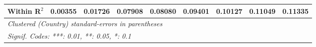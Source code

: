 \begin{table}[htbp]
\begin{tabular}{lcccccccc}
      Within R$^2$                                                     & 0.00355  & 0.01726  & 0.07908        & 0.08080        & 0.09401        & 0.10127        & 0.11049        & 0.11335\\  
      \midrule \midrule
      \multicolumn{9}{l}{\emph{Clustered (Country) standard-errors in parentheses}}\\
      \multicolumn{9}{l}{\emph{Signif. Codes: ***: 0.01, **: 0.05, *: 0.1}}\\
   \end{tabular}
\end{table}


